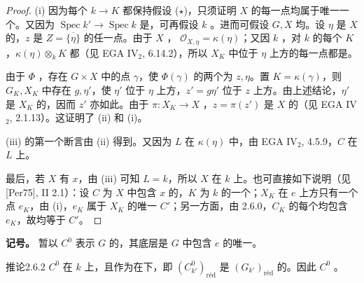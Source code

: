 \begin{proof}
(i) 因为每个 $k\to K$ 都保持假设 ($\star$)，只须证明 $X$ 的每一点均属于唯一一个。又因为 $\operatorname{Spec}k'\to\operatorname{Spec}k$ 是，可再假设 $k$ 。进而可假设 $G,X$ 均。设 $\eta$ 是 $X$ 的，$z$ 是 $Z=\overline{\{\eta\}}$ 的任一点。由于 $X$ ， $\mathcal O_{X,\eta}=\kappa(\eta)$；又因 $k$ ，对 $k$ 的每个 $K$，$\kappa(\eta)\otimes_k K$ 都（见 EGA IV$_2$, 6.14.2），所以 $X_K$ 中位于 $\eta$ 上方的每一点都是。

由于 $\Phi$ ，存在 $G\times X$ 中的点 $\gamma$，使 $\Phi(\gamma)$ 的两个为 $z,\eta$。置 $K=\kappa(\gamma)$，则 $G_K,X_K$ 中存在 $g,\eta'$，使 $\eta'$ 位于 $\eta$ 上方，$z'=g\eta'$ 位于 $z$ 上方。由上述结论，$\eta'$ 是 $X_K$ 的，因而 $z'$ 亦如此。由于 $\pi:X_K\to X$ ，$z=\pi(z')$ 是 $X$ 的（见 EGA IV$_2$, 2.1.13）。这证明了 (ii) 和 (i)。

(iii) 的第一个断言由 (ii) 得到。又因为 $L$ 在 $\kappa(\eta)$ 中，由 EGA IV$_2$, 4.5.9，$C$ 在 $L$ 上。

最后，若 $X$ 有 $x$，由 (iii) 可知 $L=k$，所以 $X$ 在 $k$ 上。也可直接如下说明（见 [Per75], II 2.1）：设 $C$ 为 $X$ 中包含 $x$ 的，$K$ 为 $k$ 的一个；$X_K$ 在 $e$ 上方只有一个点 $e_K$，由 (i)，$e_K$ 属于 $X_K$ 的唯一 $C'$；另一方面，由 2.6.0，$C_K$ 的每个均包含 $e_K$，故均等于 $C'$。
\end{proof}
\textbf{记号。} 暂以 $C^0$ 表示 $G$ 的，其底层是 $G$ 中包含 $e$ 的唯一。
\begin{SGAresult}{推论}{2.6.2}
$C^0$ 在 $k$ 上，且作为在下，即 $(C^0_{k'})_{\mathrm{r\text{é}d}}$ 是 $(G_{k'})_{\mathrm{r\text{é}d}}$ 的。因此 $C^0$ 。
\end{SGAresult}
